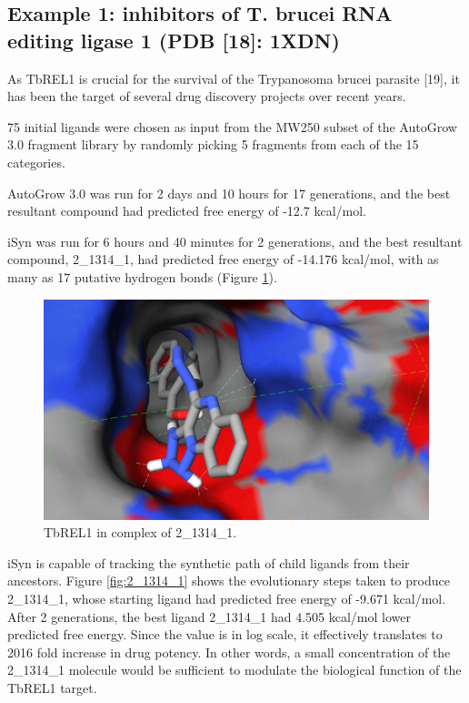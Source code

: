 \subsection{Example 1: inhibitors of T. brucei RNA editing ligase 1 (PDB [18]: 1XDN)}

As TbREL1 is crucial for the survival of the Trypanosoma brucei parasite [19], it has been the target of several drug discovery projects over recent years.

75 initial ligands were chosen as input from the MW250 subset of the AutoGrow 3.0 fragment library by randomly picking 5 fragments from each of the 15 categories.

AutoGrow 3.0 was run for 2 days and 10 hours for 17 generations, and the best resultant compound had predicted free energy of -12.7 kcal/mol.

iSyn was run for 6 hours and 40 minutes for 2 generations, and the best resultant compound, 2\_1314\_1, had predicted free energy of -14.176 kcal/mol, with as many as 17 putative hydrogen bonds (Figure \ref{fig:1XDN}).

\begin{figure}
\begin{center}
\includegraphics[width=\linewidth]{../isyn/1XDN.png}
\end{center}
\caption{TbREL1 in complex of 2\_1314\_1.}
\label{fig:1XDN}
\end{figure}

iSyn is capable of tracking the synthetic path of child ligands from their ancestors. Figure \ref{fig:2_1314_1} shows the evolutionary steps taken to produce 2\_1314\_1, whose starting ligand had predicted free energy of -9.671 kcal/mol. After 2 generations, the best ligand 2\_1314\_1 had 4.505 kcal/mol lower predicted free energy. Since the value is in log scale, it effectively translates to 2016 fold increase in drug potency. In other words, a small concentration of the 2\_1314\_1 molecule would be sufficient to modulate the biological function of the TbREL1 target.

